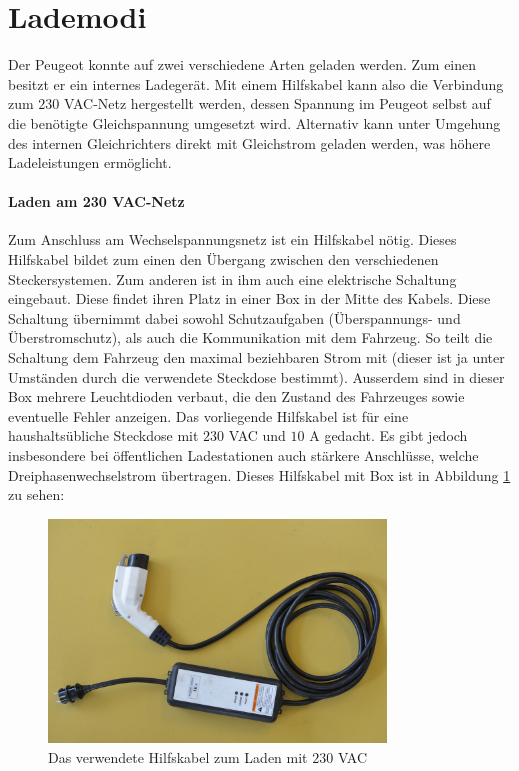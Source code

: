 \section{Lademodi}
Der Peugeot konnte auf zwei verschiedene Arten geladen werden. Zum einen besitzt er ein internes Ladegerät. Mit einem Hilfskabel kann also die Verbindung zum $230$ VAC-Netz hergestellt werden, dessen Spannung im Peugeot selbst auf die benötigte Gleichspannung umgesetzt wird. Alternativ kann unter Umgehung des internen Gleichrichters direkt mit Gleichstrom geladen werden, was höhere Ladeleistungen ermöglicht.

\paragraph{Laden am 230 VAC-Netz}
Zum Anschluss am Wechselspannungsnetz ist ein Hilfskabel nötig. Dieses Hilfskabel bildet zum einen den Übergang zwischen den verschiedenen Steckersystemen. Zum anderen ist in ihm auch eine elektrische Schaltung eingebaut. Diese findet ihren Platz in einer Box in der Mitte des Kabels. Diese Schaltung übernimmt dabei sowohl Schutzaufgaben (Überspannungs- und Überstromschutz), als auch die Kommunikation mit dem Fahrzeug. So teilt die Schaltung dem Fahrzeug den maximal beziehbaren Strom mit (dieser ist ja unter Umständen durch die verwendete Steckdose bestimmt). Ausserdem sind in dieser Box mehrere Leuchtdioden verbaut, die den Zustand des Fahrzeuges sowie eventuelle Fehler anzeigen. Das vorliegende Hilfskabel ist für eine haushaltsübliche Steckdose mit $230$ VAC und $10$ A gedacht. Es gibt jedoch insbesondere bei öffentlichen Ladestationen auch stärkere Anschlüsse, welche Dreiphasenwechselstrom übertragen. Dieses Hilfskabel mit Box ist in Abbildung \ref{fig:Hilfskabel} zu sehen:

\begin{figure}[h]
	\centering
		\includegraphics[width=0.80\textwidth]{images/Hilfskabel.JPG}
	\caption{Das verwendete Hilfskabel zum Laden mit $230$ VAC}
	\label{fig:Hilfskabel}
\end{figure}

